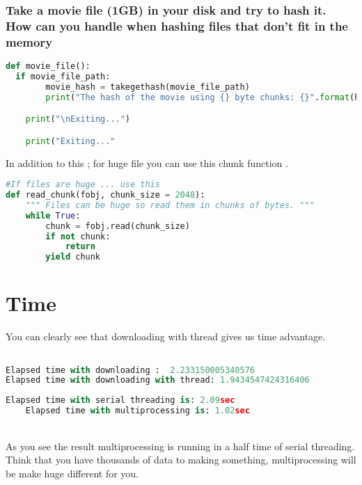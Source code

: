 \documentclass[onecolumn]{article}
\begin{document}
\subsubsection{Take a movie file (1GB) in your disk and try to hash it. How can you handle when hashing files that don't fit in the memory}

\begin{lstlisting}[language=Python, caption= Downloading huge data ]
def movie_file():
  if movie_file_path:
        movie_hash = takegethash(movie_file_path)
        print("The hash of the movie using {} byte chunks: {}".format(hash_buffer_size, movie_hash))

    print("\nExiting...")

    print("Exiting..."
    \end{lstlisting}
    
    In addition to this ;  for huge file you can use this chunk  function .
    
    \begin{lstlisting}[language=Python, caption= Chunk is for huge files ]
    #If files are huge ... use this
def read_chunk(fobj, chunk_size = 2048):
    """ Files can be huge so read them in chunks of bytes. """
    while True:
        chunk = fobj.read(chunk_size)
        if not chunk:
            return
        yield chunk
        \end{lstlisting}

\section{Time}

You can clearly see that downloading with thread gives us time advantage.

\begin{lstlisting}[language=Python, caption=Output Comparing Downloading Process ]

Elapsed time with downloading :  2.233150005340576 
Elapsed time with downloading with thread: 1.9434547424316406 

\end{lstlisting}



\begin{lstlisting}[language=Python, caption=Output of difference]
    Elapsed time with serial threading is: 2.09sec
    Elapsed time with multiprocessing is: 1.02sec
\end{lstlisting}

\\As you see the result multiprocessing is running in a half time of serial threading. Think that you have thousands of data to making something, multiprocessing will be make huge different for you.
\end{document}
